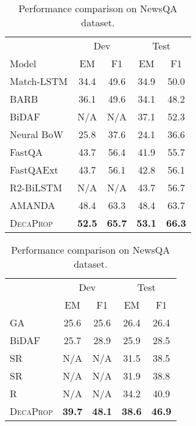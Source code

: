 \documentclass{article}
\begin{document}
\begin{table}[t]
\small
\centering
    \begin{minipage}[t]{.46\linewidth}
    \centering
       \begin{tabular}{lcccc}
    \hline
          & \multicolumn{2}{c}{Dev} & \multicolumn{2}{c}{Test} \\
          \cline{2-5}
    Model & EM    & F1    & EM    & F1 \\
    \hline
Match-LSTM  & 34.4  & 49.6  & 34.9  & 50.0 \\
    BARB  & 36.1  & 49.6  & 34.1  & 48.2 \\
    BiDAF & N/A    & N/A     & 37.1  & 52.3 \\
    Neural BoW & 25.8  & 37.6  & 24.1  & 36.6 \\
    FastQA & 43.7  & 56.4  & 41.9  & 55.7 \\
    FastQAExt & 43.7  & 56.1  & 42.8  & 56.1 \\
    R2-BiLSTM & N/A     & N/A     & 43.7  & 56.7 \\
    AMANDA & 48.4  & 63.3  & 48.4  & 63.7 \\
\hline
\textsc{DecaProp} & \textbf{52.5}  & \textbf{65.7}  & \textbf{53.1}  & \textbf{66.3} \\
    \hline


    \end{tabular}

     \caption{Performance comparison on NewsQA dataset. }
 \label{newsqa}
    \end{minipage}\hfill
    \begin{minipage}[t]{.46\linewidth}
\centering
     \begin{tabular}{lcccc}
     \hline
          & \multicolumn{2}{c}{Dev} & \multicolumn{2}{c}{Test} \\

             \cline{2-5}
          & EM    & F1    & EM    & F1 \\
       \hline
GA    & 25.6  & 25.6  & 26.4  & 26.4 \\
    BiDAF & 25.7  & 28.9  & 25.9  & 28.5 \\
    SR & N/A     & N/A     & 31.5  & 38.5 \\
    SR & N/A    & N/A     & 31.9  & 38.8 \\
    R & N/A     & N/A    & 34.2  & 40.9 \\
    \hline
    \textsc{DecaProp}& \textbf{39.7}    & \textbf{48.1}  & \textbf{38.6}  & \textbf{46.9} \\
    \hline


\end{tabular}
\end{minipage}
\end{table}
\end{document}
